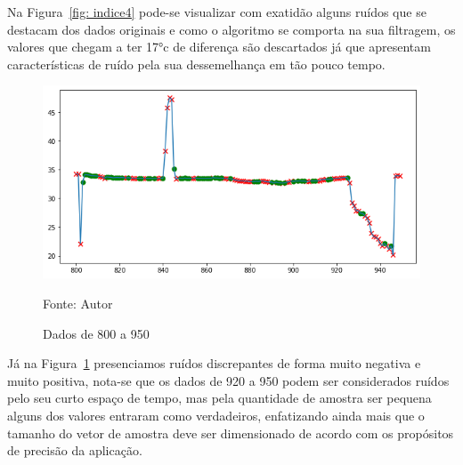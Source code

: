 Na Figura~\ref{fig: indice4} pode-se visualizar com exatidão alguns ruídos que se destacam dos dados originais e como o algoritmo se comporta na sua filtragem, os valores que chegam a ter \ang{17}c de diferença são descartados já que apresentam características de ruído pela sua dessemelhança em tão pouco tempo.

\begin{figure}[H]
	\centering
	\includegraphics[width=15cm]{imagens/sensores/indice3.png}
	\caption{Dados de 800 a 950}
	Fonte: Autor
	\label{fig: indice3}
\end{figure}

Já na Figura~\ref{fig: indice3} presenciamos ruídos discrepantes de forma muito negativa e muito positiva, nota-se que os dados de 920 a 950 podem ser considerados ruídos pelo seu curto espaço de tempo, mas pela quantidade de amostra ser pequena alguns dos valores entraram como verdadeiros, enfatizando ainda mais que o tamanho do vetor de amostra deve ser dimensionado de acordo com os propósitos de precisão da aplicação.

